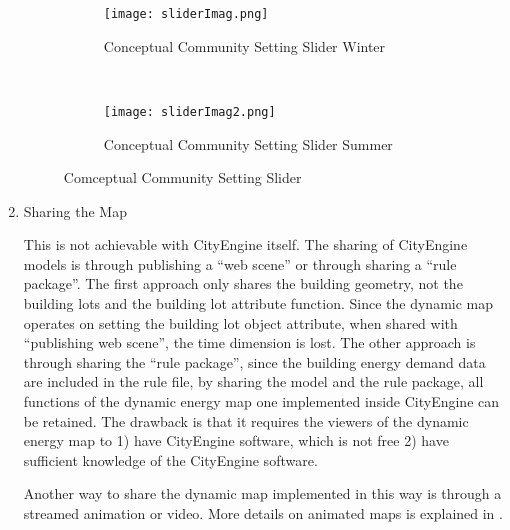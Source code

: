 \begin{enumerate}[1)]
  \begin{figure}[h!]
    \centering
    \begin{subfigure}{0.7\textwidth}
      \centering
      \texttt{[image: sliderImag.png]}
      \caption[Conceptual Community Setting Slider Winter]{Conceptual
        Community Setting Slider Winter}
      \label{fig:sliderImag}
    \end{subfigure}
    ~
    \begin{subfigure}{0.7\textwidth}
      \centering
      \texttt{[image: sliderImag2.png]}
      \caption[Conceptual Community Setting Slider Summer]{Conceptual
        Community Setting Slider Summer}
      \label{fig:sliderImag2}
    \end{subfigure}
    \caption[Comceptual Community Setting Slider]{Comceptual Community Setting Slider}
    \label{fig:conceptSlider}
  \end{figure}

\item{Sharing the Map}

  This is not achievable with CityEngine itself. The sharing of
  CityEngine models is through publishing a ``web scene'' or through
  sharing a ``rule package''. The first approach only shares the
  building geometry, not the building lots and the building lot
  attribute function. Since the dynamic map operates on setting the
  building lot object attribute, when shared with ``publishing web
  scene'', the time dimension is lost. The other approach is through
  sharing the ``rule package'', since the building energy demand data
  are included in the rule file, by sharing the model and the rule
  package, all functions of the dynamic energy map one implemented
  inside CityEngine can be retained. The drawback is that it requires
  the viewers of the dynamic energy map to 1) have CityEngine
  software, which is not free 2) have sufficient knowledge of the
  CityEngine software.

  Another way to share the dynamic map implemented in this way is
  through a streamed animation or video. More details on animated maps
  is explained in .
\end{enumerate}